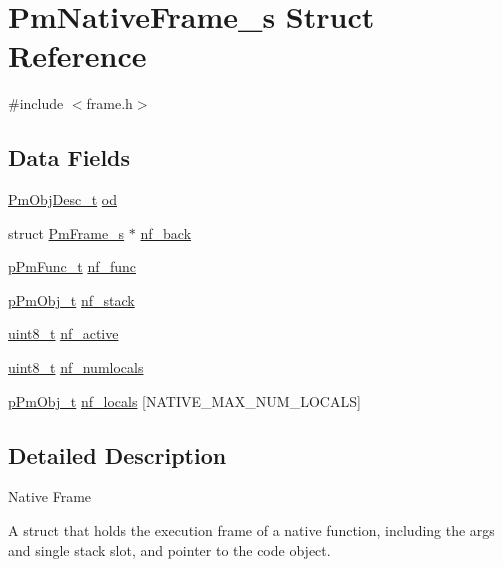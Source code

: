 \hypertarget{struct_pm_native_frame__s}{\section{Pm\-Native\-Frame\-\_\-s Struct Reference}
\label{struct_pm_native_frame__s}
}


{\ttfamily \#include $<$frame.\-h$>$}

\subsection*{Data Fields}
\begin{DoxyCompactItemize}
\item 
\hyperlink{obj_8h_a72d816790acd8eb550fb25268c2b3489}{Pm\-Obj\-Desc\-\_\-t} \hyperlink{struct_pm_native_frame__s_ac90b65bc6739e3a23db5a3f14ca022c0}{od}
\item 
struct \hyperlink{struct_pm_frame__s}{Pm\-Frame\-\_\-s} $\ast$ \hyperlink{struct_pm_native_frame__s_a631c08a862be6fee47eeb687dca58d9c}{nf\-\_\-back}
\item 
\hyperlink{func_8h_a31ea34c165a41eee786d036607d224b3}{p\-Pm\-Func\-\_\-t} \hyperlink{struct_pm_native_frame__s_a6fb82e85649064a64cf7254d14455a1c}{nf\-\_\-func}
\item 
\hyperlink{obj_8h_af293479fa3f9d92b941ee7445ad3960e}{p\-Pm\-Obj\-\_\-t} \hyperlink{struct_pm_native_frame__s_a1d1c89f138be82be6c1a7a2bfa3929c7}{nf\-\_\-stack}
\item 
\hyperlink{stdint_8h_aba7bc1797add20fe3efdf37ced1182c5}{uint8\-\_\-t} \hyperlink{struct_pm_native_frame__s_abd348d8f2281f4e7fd480089ef1d3c70}{nf\-\_\-active}
\item 
\hyperlink{stdint_8h_aba7bc1797add20fe3efdf37ced1182c5}{uint8\-\_\-t} \hyperlink{struct_pm_native_frame__s_a939bbde4c57f7cca11a1a41b1dac403a}{nf\-\_\-numlocals}
\item 
\hyperlink{obj_8h_af293479fa3f9d92b941ee7445ad3960e}{p\-Pm\-Obj\-\_\-t} \hyperlink{struct_pm_native_frame__s_a36830bf12c15b6648e1fa3a1062d195a}{nf\-\_\-locals} \mbox{[}N\-A\-T\-I\-V\-E\-\_\-\-M\-A\-X\-\_\-\-N\-U\-M\-\_\-\-L\-O\-C\-A\-L\-S\mbox{]}
\end{DoxyCompactItemize}


\subsection{Detailed Description}
Native Frame

A struct that holds the execution frame of a native function, including the args and single stack slot, and pointer to the code object.

